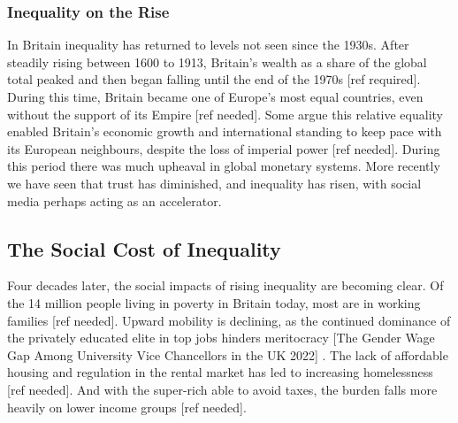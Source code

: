 \begin{comment}}I am moving on to inequality a bit, just having a look round. I know this is FAR more your bailiwick so I am just putting in some placeholder text. This sort of dovetails with 
- Collapse in trust since the 70's (potential book ref)
- A look at global economic systems post bretton woods?
- Inequality cycles over time, and the possibility for change
- Social media as an accelerant
- some reasonably clean stats and interpretations about attitudes. Maybe Danny Dorling?
- energy prices and energy abundance
- potential fracturing of society as the internet collapses in the face of AI, leading to gated communities
\end{comment}
\subsubsection{Inequality on the Rise}

In Britain inequality has returned to levels not seen since the 1930s. After steadily rising between 1600 to 1913, Britain's wealth as a share of the global total peaked and then began falling until the end of the 1970s [ref required]. During this time, Britain became one of Europe's most equal countries, even without the support of its Empire [ref needed]. Some argue this relative equality enabled Britain's economic growth and international standing to keep pace with its European neighbours, despite the loss of imperial power [ref needed]. During this period there was much upheaval in global monetary systems. More recently we have seen that trust has diminished, and inequality has risen, with social media perhaps acting as an accelerator. 

\subsection{The Social Cost of Inequality}

Four decades later, the social impacts of rising inequality are becoming clear. Of the 14 million people living in poverty in Britain today, most are in working families [ref needed]. Upward mobility is declining, as the continued dominance of the privately educated elite in top jobs hinders meritocracy [The Gender Wage Gap Among University Vice Chancellors in the UK 
2022] . The lack of affordable housing and regulation in the rental market has led to increasing homelessness [ref needed]. And with the super-rich able to avoid taxes, the burden falls more heavily on lower income groups [ref needed].


